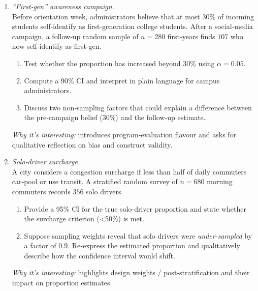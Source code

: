 \documentclass[11pt]{article}
\begin{document}
\begin{enumerate}[label=\textbf{Q\,\arabic*:}, start=6, left=0pt]
\item  \emph{“First‑gen” awareness campaign.}  \\
      Before orientation week, administrators believe that at most 30\% of incoming students self‑identify as first‑generation college students.
      After a social‑media campaign, a follow‑up random sample of $n=280$ first‑years finds $107$ who now self‑identify as first‑gen.  
      \begin{enumerate}[label=(\alph*)]
          \item Test whether the proportion has increased beyond 30\% using $\alpha=0.05$.  
          \item Compute a 90\% CI and interpret in plain language for campus administrators.  
          \item Discuss two non‑sampling factors that could explain a difference between the pre‑campaign belief (30\%) and the follow‑up estimate.
      \end{enumerate}
      \textit{Why it’s interesting:} introduces program‐evaluation flavour and asks for qualitative reflection on bias and construct validity.  

\item  \emph{Solo‑driver surcharge.}  \\
      A city considers a congestion surcharge if less than half of daily commuters car‑pool or use transit.  
      A stratified random survey of $n=680$ morning commuters records $356$ solo drivers.  
      \begin{enumerate}[label=(\alph*)]
          \item Provide a 95\% CI for the true solo‑driver proportion and state whether the surcharge criterion (<50\%) is met.  
          \item Suppose sampling weights reveal that solo drivers were \emph{under‑sampled} by a factor of 0.9.  
                Re‑express the estimated proportion and qualitatively describe how the confidence interval would shift.  
      \end{enumerate}
      \textit{Why it’s interesting:} highlights design weights / post‑stratification and their impact on proportion estimates.  


\end{enumerate}
\end{document}

